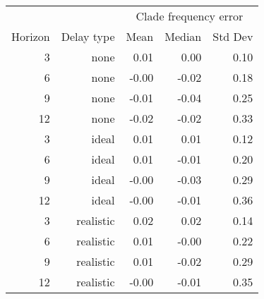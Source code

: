 
\begin{tabular*}{0.7\textwidth}{rrrrr}
\toprule
        &            & \multicolumn{3}{c}{Clade frequency error} \\
Horizon & Delay type & Mean & Median & Std Dev \\
\midrule

3 & none & 0.01 & 0.00 & 0.10 \\
6 & none & -0.00 & -0.02 & 0.18 \\
9 & none & -0.01 & -0.04 & 0.25 \\
12 & none & -0.02 & -0.02 & 0.33 \\
3 & ideal & 0.01 & 0.01 & 0.12 \\
6 & ideal & 0.01 & -0.01 & 0.20 \\
9 & ideal & -0.00 & -0.03 & 0.29 \\
12 & ideal & -0.00 & -0.01 & 0.36 \\
3 & realistic & 0.02 & 0.02 & 0.14 \\
6 & realistic & 0.01 & -0.00 & 0.22 \\
9 & realistic & 0.01 & -0.02 & 0.29 \\
12 & realistic & -0.00 & -0.01 & 0.35 \\

\bottomrule
\end{tabular*}

